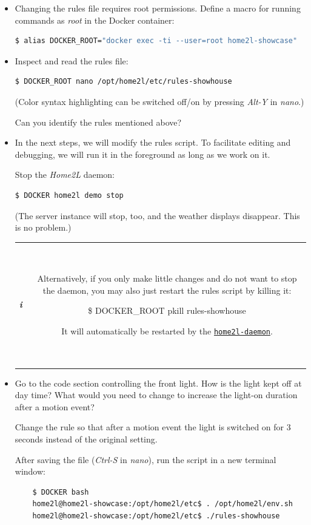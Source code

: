 \documentclass[12pt,english,parskip=half,headheight=19pt]{scrreprt}
\newcommand{\lstbox}[1]{
  \par
  \colorbox{lstbackground}{\ttfamily\footnotesize{\parbox{\linewidth}{#1}}}
  \par
}
\newcommand{\infobox}[1]{
  \par
  \medskip
  \hfill
  \setlength\arrayrulewidth{1pt}
  \begin{tabular}[t]{c|c|}
    \parbox{1.8em}{\hfill\textit{\Huge\textbf{i}\,}}
    &
    \,\parbox{0.89\linewidth}{\setlength{\parskip}{0.5em} \small #1}\,
  \end{tabular}
  \medskip
  \par
}
\newcommand{\idx}[1]{#1\index{#1}}
\newcommand{\reftool}[1]{\hyperref[tool:#1]{\texttt{\idx{#1}}}}
\begin{document}
\begin{itemize}[$\blacktriangleright$]

\item
  Changing the rules file requires root permissions. Define a macro for running commands as
  \textit{root} in the Docker container:
  \begin{lstlisting}[language=bash]
    $ alias DOCKER_ROOT="docker exec -ti --user=root home2l-showcase"
  \end{lstlisting}

\item
  Inspect and read the rules file:
  \begin{lstlisting}[language=bash]
    $ DOCKER_ROOT nano /opt/home2l/etc/rules-showhouse
  \end{lstlisting}

  (Color syntax highlighting can be switched off/on by pressing \textit{Alt-Y} in \textit{nano}.)

  Can you identify the rules mentioned above?

\item
  In the next steps, we will modify the rules script. To facilitate editing and debugging,
  we will run it in the foreground as long as we work on it.

  Stop the \textit{Home2L} daemon:
  \begin{lstlisting}[language=bash]
    $ DOCKER home2l demo stop
  \end{lstlisting}

  (The server instance will stop, too, and the weather displays disappear. This is no problem.)

  \infobox{
    Alternatively, if you only make little changes and do not want to stop the daemon,
    you may also just restart the rules script by killing it:
    \lstbox{\$ DOCKER\_ROOT pkill rules-showhouse}
    It will automatically be restarted by the \reftool{home2l-daemon}.
  }

\item
  Go to the code section controlling the front light.
  How is the light kept off at day time?
  What would you need to change to increase the light-on duration after a motion event?

  Change the rule so that after a motion event the light is switched on for 3 seconds instead of
  the original setting.

  After saving the file (\textit{Ctrl-S} in \textit{nano}), run the script in a new terminal window:
  \begin{lstlisting}
    $ DOCKER bash
    home2l@home2l-showcase:/opt/home2l/etc$ . /opt/home2l/env.sh
    home2l@home2l-showcase:/opt/home2l/etc$ ./rules-showhouse
  \end{lstlisting}


\end{itemize}
\end{document}
